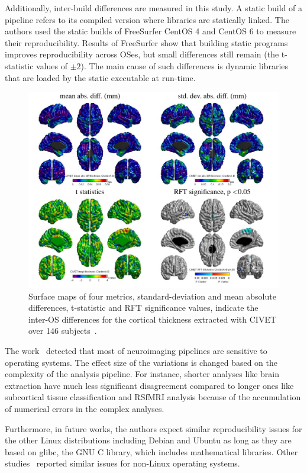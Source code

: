 Additionally, inter-build differences are measured in this study. A 
static build of a pipeline refers to its compiled version where 
libraries are statically linked. The authors used the 
static builds of FreeSurfer CentOS 4 and CentOS 6 to measure their 
reproducibility. Results of FreeSurfer show that building static programs improves 
reproducibility across OSes, but small differences still remain
(the t-statistic values of $±2$). The 
main cause of such differences is dynamic libraries that are loaded by 
the static executable at run-time. 

\begin{figure}[H]
\centering
	\includegraphics[scale=0.9]{chapters/background/images/inter-os-diff} 
	\caption{Surface maps of four metrics, standard-deviation and mean 
	absolute differences, t-statistic and RFT significance values, 
	indicate the inter-OS differences for the cortical thickness 
	extracted with CIVET over 146 subjects~\cite{Glatard2015}. } 
	\label{inter_os}
\end{figure}
 

The work~\cite{Glatard2015} detected that most of
neuroimaging pipelines are sensitive to operating 
systems. The effect size of the variations is changed based on the 
complexity of the analysis pipeline. For instance, shorter analyses 
like brain extraction have much less significant disagreement compared 
to longer ones like subcortical tissue classification and RSfMRI
analysis because of the accumulation of numerical errors in the complex analyses.

Furthermore, in future works, the authors expect similar reproducibility issues for the 
other Linux distributions including Debian and Ubuntu as long as they 
are based on glibc, the GNU C library, which includes mathematical 
libraries. Other studies~\cite{Gronenschild2012, 
Krefting2011} reported similar issues for non-Linux operating systems. 


